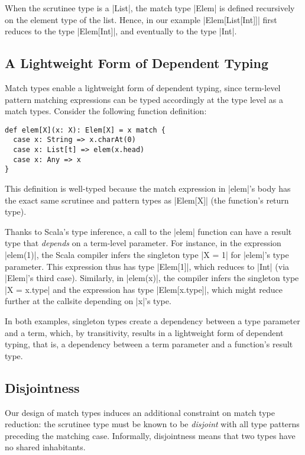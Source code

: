 When the scrutinee type is a |List|, the match type |Elem| is defined recursively on the element type of the list.
Hence, in our example |Elem[List[Int]]| first reduces to the type |Elem[Int]|, and eventually to the type |Int|.

\subsection{A Lightweight Form of Dependent Typing}
Match types enable a lightweight form of dependent typing, since term-level pattern matching expressions can be typed accordingly at the type level as a match types.
Consider the following function definition:
%
\begin{lstlisting}
def elem[X](x: X): Elem[X] = x match {
  case x: String => x.charAt(0)
  case x: List[t] => elem(x.head)
  case x: Any => x
}
\end{lstlisting}
%
This definition is well-typed because the match expression in |elem|'s body has the exact same scrutinee and pattern types as |Elem[X]| (the function's return type).

Thanks to Scala's type inference, a call to the |elem| function can have a result type that \emph{depends} on a term-level parameter.
For instance, in the expression |elem(1)|, the Scala compiler infers the singleton type |X = 1| for |elem|'s type parameter.
This expression thus has type |Elem[1]|, which reduces to |Int| (via |Elem|'s third case).
Similarly, in |elem(x)|, the compiler infers the singleton type |X = x.type| and the expression has type |Elem[x.type]|, which might reduce further at the callsite depending on |x|'s type.

In both examples, singleton types create a dependency between a type parameter and a term, which, by transitivity, results in a lightweight form of dependent typing, that is, a dependency between a term parameter and a function's result type.

\subsection{Disjointness}
Our design of match types induces an additional constraint on match type reduction: the scrutinee type must be known to be \emph{disjoint} with all type patterns preceding the matching case. Informally, disjointness means that two types have no shared inhabitants.

